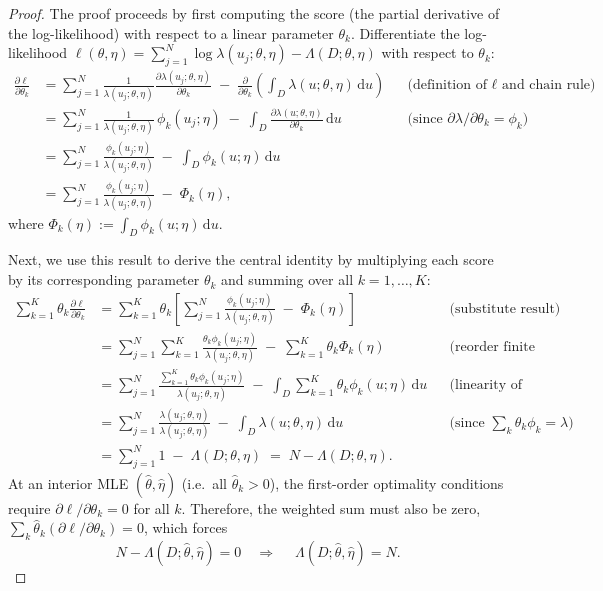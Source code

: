 \documentclass[extra,mreferee]{gji}
\theoremstyle{lemma}
\begin{document}
\begin{proof}
The proof proceeds by first computing the score (the partial derivative of the log-likelihood) with respect to a linear parameter $\theta_k$.
Differentiate the log-likelihood $\ell(\theta,\eta)=\sum_{j=1}^N \log \lambda(u_j;\theta,\eta)-\Lambda(D;\theta,\eta)$ with respect to $\theta_k$:
\begin{align*}
\frac{\partial \ell}{\partial \theta_k}
&= \sum_{j=1}^N \frac{1}{\lambda(u_j;\theta,\eta)} \frac{\partial \lambda(u_j;\theta,\eta)}{\partial \theta_k}
     \;-\; \frac{\partial}{\partial \theta_k}\!\left(\int_D \lambda(u;\theta,\eta)\, \mathrm{d}u\right)
     && \text{(definition of $\ell$ and chain rule)}\\[2pt]
&= \sum_{j=1}^N \frac{1}{\lambda(u_j;\theta,\eta)} \,\phi_k(u_j;\eta)
     \;-\; \int_D \frac{\partial \lambda(u;\theta,\eta)}{\partial \theta_k}\, \mathrm{d}u
     && \text{(since $\partial \lambda/\partial \theta_k=\phi_k$)}\\[2pt]
&= \sum_{j=1}^N \frac{\phi_k(u_j;\eta)}{\lambda(u_j;\theta,\eta)}
     \;-\; \int_D \phi_k(u;\eta)\, \mathrm{d}u\\[2pt]
&= \sum_{j=1}^N \frac{\phi_k(u_j;\eta)}{\lambda(u_j;\theta,\eta)} \;-\; \Phi_k(\eta),
\end{align*}
where $\displaystyle \Phi_k(\eta):=\int_D \phi_k(u;\eta)\, \mathrm{d}u$.

Next, we use this result to derive the central identity by multiplying each score by its corresponding parameter $\theta_k$ and summing over all $k=1,\dots,K$:
\begin{align*}
\sum_{k=1}^{K}\theta_k \frac{\partial \ell}{\partial \theta_k}
&= \sum_{k=1}^{K}\theta_k \left[
     \sum_{j=1}^{N}\frac{\phi_k(u_j;\eta)}{\lambda(u_j;\theta,\eta)} \;-\; \Phi_k(\eta)
   \right]
     && \text{(substitute result)}\\[2pt]
&= \sum_{j=1}^{N} \sum_{k=1}^{K}\frac{\theta_k \phi_k(u_j;\eta)}{\lambda(u_j;\theta,\eta)}
   \;-\; \sum_{k=1}^{K}\theta_k \Phi_k(\eta)
     && \text{(reorder finite sums)}\\[2pt]
&= \sum_{j=1}^{N} \frac{\sum_{k=1}^{K}\theta_k \phi_k(u_j;\eta)}{\lambda(u_j;\theta,\eta)}
   \;-\; \int_D \sum_{k=1}^K \theta_k \phi_k(u;\eta)\, \mathrm{d}u
     && \text{(linearity of integral)}\\[2pt]
&= \sum_{j=1}^{N} \frac{\lambda(u_j;\theta,\eta)}{\lambda(u_j;\theta,\eta)}
   \;-\; \int_D \lambda(u;\theta,\eta)\, \mathrm{d}u
     && \text{(since $\sum_k \theta_k \phi_k=\lambda$)}\\[2pt]
&= \sum_{j=1}^{N} 1 \;-\; \Lambda(D;\theta,\eta)
     \;=\; N - \Lambda(D;\theta,\eta).
\end{align*}
At an interior MLE $(\hat\theta,\hat\eta)$ (i.e.\ all $\hat\theta_k>0$), the first-order optimality conditions require $\partial \ell/\partial \theta_k=0$ for all $k$. Therefore, the weighted sum must also be zero, $\sum_k \hat\theta_k(\partial \ell/\partial \theta_k)=0$, which forces
\[
N-\Lambda(D;\hat\theta,\hat\eta)=0
\quad\Longrightarrow\quad
\boxed{\;\Lambda(D;\hat\theta,\hat\eta)=N.\;}
\]
\end{proof}
\end{document}

